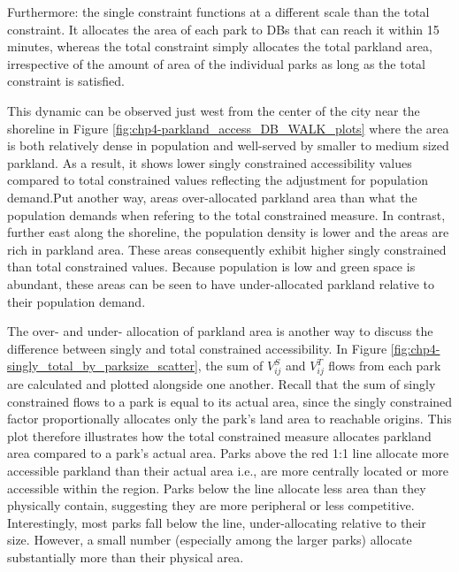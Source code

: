 \documentclass[
11pt, %
oneside, %
english, %
singlespacing, %
]{macthesis} %
\begin{document}
Furthermore: the single constraint functions at a different scale than the total constraint. It allocates the area of each park to DBs that can reach it within 15 minutes, whereas the total constraint simply allocates the total parkland area, irrespective of the amount of area of the individual parks as long as the total constraint is satisfied.

This dynamic can be observed just west from the center of the city near the shoreline in Figure \ref{fig:chp4-parkland_access_DB_WALK_plots} where the area is both relatively dense in population and well-served by smaller to medium sized parkland. As a result, it shows lower singly constrained accessibility values compared to total constrained values reflecting the adjustment for population demand.Put another way, areas over-allocated parkland area than what the population demands when refering to the total constrained measure. In contrast, further east along the shoreline, the population density is lower and the areas are rich in parkland area. These areas consequently exhibit higher singly constrained than total constrained values. Because population is low and green space is abundant, these areas can be seen to have under-allocated parkland relative to their population demand.

The over- and under- allocation of parkland area is another way to discuss the difference between singly and total constrained accessibility. In Figure \ref{fig:chp4-singly_total_by_parksize_scatter}, the sum of \(V_{ij}^S\) and \(V_{ij}^T\) flows from each park are calculated and plotted alongside one another. Recall that the sum of singly constrained flows to a park is equal to its actual area, since the singly constrained factor proportionally allocates only the park's land area to reachable origins. This plot therefore illustrates how the total constrained measure allocates parkland area compared to a park's actual area. Parks above the red 1:1 line allocate more accessible parkland than their actual area i.e., are more centrally located or more accessible within the region. Parks below the line allocate less area than they physically contain, suggesting they are more peripheral or less competitive. Interestingly, most parks fall below the line, under-allocating relative to their size. However, a small number (especially among the larger parks) allocate substantially more than their physical area.
\end{document}
